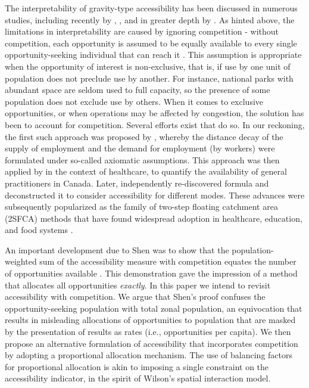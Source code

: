 \documentclass[]{elsarticle} %
\begin{document}
The interpretability of gravity-type accessibility has been discussed in
numerous studies, including recently by \citet{hu_2019_measuring},
\citet{kelobonye2020measuring}, and in greater depth by
\citet{merlin2017competition}. As hinted above, the limitations in
interpretability are caused by ignoring competition - without
competition, each opportunity is assumed to be equally available to
every single opportunity-seeking individual that can reach it
\citep{shen1998, paez2019, kelobonye2020measuring}. This assumption is
appropriate when the opportunity of interest is non-exclusive, that is,
if use by one unit of population does not preclude use by another. For
instance, national parks with abundant space are seldom used to full
capacity, so the presence of some population does not exclude use by
others. When it comes to exclusive opportunities, or when operations may
be affected by congestion, the solution has been to account for
competition. Several efforts exist that do so. In our reckoning, the
first such approach was proposed by \citet{weibull_axiomatic_1976},
whereby the distance decay of the supply of employment and the demand
for employment (by workers) were formulated under so-called axiomatic
assumptions. This approach was then applied by \citet{joseph1984} in the
context of healthcare, to quantify the availability of general
practitioners in Canada. Later, \citet{shen1998} independently
re-discovered \citet{weibull_axiomatic_1976} formula \citep[see footnote
(7) in][]{shen1998} and deconstructed it to consider accessibility for
different modes. These advances were subsequently popularized as the
family of two-step floating catchment area (2SFCA) methods
\citep{luo2003} that have found widespread adoption in healthcare,
education, and food systems
\citep{yang_comparing_2006, chen_spatial_2020, ye_spatial_2018, chen_enhancing_2019, chen_evaluating_2020}.

An important development due to Shen was to show that the
population-weighted sum of the accessibility measure with competition
equates the number of opportunities available \citep[footnote (7) and
Appendix A in][]{shen1998}. This demonstration gave the impression of a
method that allocates all opportunities \emph{exactly}. In this paper we
intend to revisit accessibility with competition. We argue that Shen's
proof confuses the opportunity-seeking population with total zonal
population, an equivocation that results in misleading allocations of
opportunities to population that are masked by the presentation of
results as rates (i.e., opportunities per capita). We then propose an
alternative formulation of accessibility that incorporates competition
by adopting a proportional allocation mechanism. The use of balancing
factors for proportional allocation is akin to imposing a single
constraint on the accessibility indicator, in the spirit of Wilson's
\citeyearpar{wilson1971} spatial interaction model.
\end{document}
